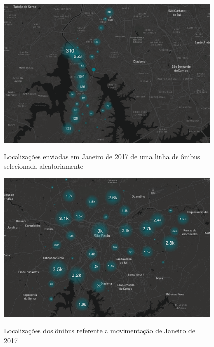 \documentclass[
	12pt,				%
	oneside,			%
	a4paper,			%
	english,			%
	brazil				%
	]{abntex2ppgsi}
\begin{document}
{{{\begin{figure}[!htb]%
	\centering
 	  \caption{Localizações enviadas em Janeiro de 2017 de uma linha de ônibus selecionada aleatoriamente}
		\includegraphics[width=0.95\linewidth]{images/only_one_bus_map.png}
	\label{fig:only_one_bus_map}
\end{figure}

\begin{figure}[!htb]%
	\centering
 	  \caption{Localizações dos ônibus referente a movimentação de Janeiro de 2017}
		\includegraphics[width=0.95\linewidth]{images/buses_map.png}
	\label{fig:buses_map}
\end{figure}

}}}
\end{document}
